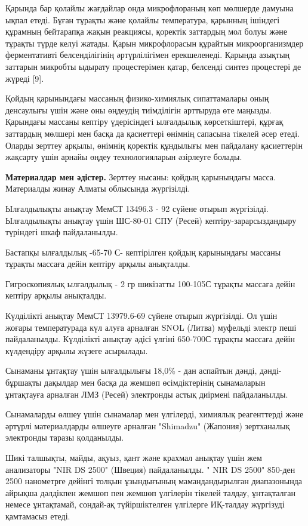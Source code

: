 \begin{multicols}{2}
Қарында бар қолайлы жағдайлар онда микрофлораның көп мөлшерде дамуына
ықпал етеді. Бұған тұрақты және қолайлы температура, қарынның ішіндегі
құрамның бейтарапқа жақын реакциясы, қоректік заттардың мол болуы және
тұрақты түрде келуі жатады. Қарын микрофлорасын құрайтын
микроорганизмдер ферментативті белсенділігінің әртүрлілігімен
ерекшеленеді. Қарында азықтың заттарын микробты ыдырату процестерімен
қатар, белсенді синтез процестері де жүреді {[}9{]}.

Қойдың қарынындағы массаның физико-химиялық сипаттамалары оның
денсаулығы үшін және оны өңдеудің тиімділігін арттыруда өте маңызды.
Қарындағы массаны кептіру үдерісіндегі ылғалдылық көрсеткіштері, құрғақ
заттардың мөлшері мен басқа да қасиеттері өнімнің сапасына тікелей әсер
етеді. Оларды зерттеу арқылы, өнімнің қоректік құндылығы мен пайдалану
қасиеттерін жақсарту үшін арнайы өңдеу технологияларын әзірлеуге болады.

{\bfseries Материалдар мен әдістер.} Зерттеу нысаны: қойдың қарынындағы
масса. Материалды жинау Алматы облысында жүргізілді.

Ылғалдылықты анықтау МемСТ 13496.3 - 92 сүйене отырып жүргізілді.
Ылғалдылықты анықтау үшін ШС-80-01 СПУ (Ресей) кептіру-зарарсыздандыру
түріндегі шкаф пайдаланылды.

Бастапқы ылғалдылық -65-70 С- кептірілген қойдың
қарынындағы массаны тұрақты массаға дейін кептіру арқылы анықталды.

Гигроскопиялық ылғалдылық - 2 гр шикізатты 100-105С
тұрақты массаға дейін кептіру арқылы анықталды.

Күлділікті анықтау МемСТ 13979.6-69 сүйене отырып жүргізілді. Ол үшін
жоғары температурада күл алуға арналған SNOL (Литва) муфельді электр
пеші пайдаланылды. Күлділікті анықтау әдісі үлгіні
650-700С тұрақты массаға дейін күлдендіру арқылы
жүзеге асырылады.

Сынаманы ұнтақтау үшін ылғалдылығы 18,0\% - дан аспайтын дәнді,
дәнді-бұршақты дақылдар мен басқа да жемшөп өсімдіктерінің сынамаларын
ұнтақтауға арналған ЛМЗ (Ресей) электронды астық диірмені пайдаланылды.

Сынамаларды өлшеу үшін сынамалар мен үлгілерді, химиялық реагенттерді
және әртүрлі материалдарды өлшеуге арналған "Shimadzu" (Жапония)
зертханалық электронды таразы қолданылды.

Шикі талшықты, майды, ақуыз, қант және крахмал анықтау үшін жем
анализаторы "NIR DS 2500" (Швеция) пайдаланылды. " NIR DS 2500" 850-ден
2500 нанометрге дейінгі толқын ұзындығының мамандандырылған диапазонында
айрықша дәлдікпен жемшөп пен жемшөп үлгілерін тікелей талдау,
ұнтақталған немесе ұнтақтамай, сондай-ақ түйіршіктелген үлгілерге
ИҚ-талдау жүргізуді қамтамасыз етеді.


\end{multicols}
